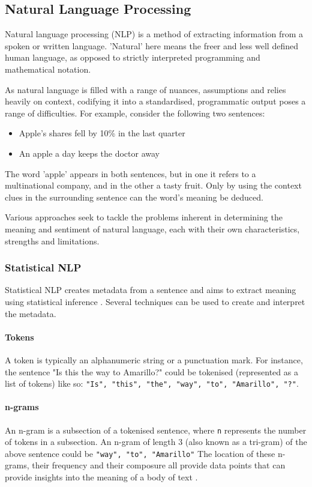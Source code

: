 \subsection{Natural Language Processing}
Natural language processing (NLP) is a method of extracting information from a spoken or written language. 'Natural' here means the freer and less well defined human language, as opposed to strictly interpreted programming and mathematical notation. \cite{jackson2002}

 As natural language is filled with a range of nuances, assumptions and relies heavily on context, codifying it into a standardised, programmatic output poses a range of difficulties. For example, consider the following two sentences:

\begin{itemize}
	\item Apple's shares fell by 10\% in the last quarter
	\item An apple a day keeps the doctor away
\end{itemize}

The word 'apple' appears in both sentences, but in one it refers to a multinational company, and in the other a tasty fruit. Only by using the context clues in the surrounding sentence can the word's meaning be deduced.

Various approaches seek to tackle the problems inherent in determining the meaning and sentiment of natural language, each with their own characteristics, strengths and limitations. 

\subsubsection{Statistical NLP}
Statistical NLP creates metadata from a sentence and aims to extract meaning using statistical inference \cite{manning1999}. Several techniques can be used to create and interpret the metadata.

\paragraph{Tokens}
A token is typically an alphanumeric string or a punctuation mark. For instance, the sentence "Is this the way to Amarillo?" could be tokenised (represented as a list of tokens) like so: \texttt{"Is", "this", "the", "way", "to", "Amarillo", "?"}.\par
	
\paragraph{n-grams}
An n-gram is a subsection of a tokenised sentence, where \texttt{n} represents the number of tokens in a subsection. An n-gram of length 3 (also known as a tri-gram) of the above sentence could be \texttt{"way", "to", "Amarillo"}
	The location of these n-grams, their frequency and their composure all provide data points that can provide insights into the meaning of a body of text \cite{banerjee2003}.
	
